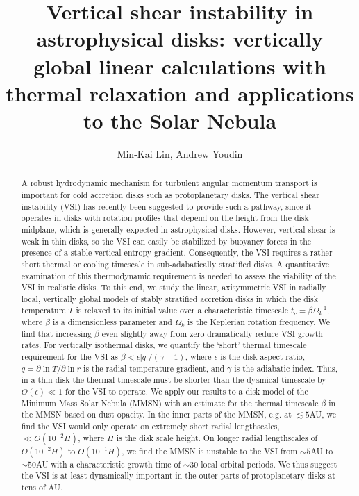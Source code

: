 \documentclass[iop]{emulateapj}
\newcommand{\p}{\partial}
\begin{document}
\title{Vertical shear instability in astrophysical disks: vertically global linear calculations with thermal relaxation and applications to the Solar Nebula} 
\author{Min-Kai Lin, Andrew Youdin}

\begin{abstract}
  A robust hydrodynamic mechanism for turbulent angular momentum
  transport is important for cold accretion disks such as 
  protoplanetary disks. The vertical shear instability (VSI) has 
  recently been suggested to provide such a pathway, since it operates in
  disks with rotation profiles that depend on the height from the 
  disk midplane, which is generally expected in  
  astrophysical disks. However, vertical shear is weak in thin disks, 
  so the VSI can easily be stabilized by buoyancy forces in the
  presence of a stable vertical entropy  gradient. %
  Consequently,  the VSI
  requires a rather short thermal or cooling timescale in
  sub-adabatically stratified disks.      
  A quantitative examination of this thermodynamic 
  requirement is needed to assess the viability of
  the VSI in realistic disks. To this end,  
  we study the linear, axisymmetric VSI in radially local, 
  vertically global models of stably stratified accretion disks in which the disk  
  temperature $T$ is relaxed to its initial value over a characteristic timescale 
  $t_c=\beta\Omega_k^{-1}$, where $\beta$ is a dimensionless parameter 
  and $\Omega_k$ is the Keplerian rotation frequency. %
  We find that 
  increasing $\beta$ even slightly away from    
  zero dramatically reduce VSI growth rates. 
  For vertically isothermal disks, we quantify the
  `short' thermal timescale requirement for the VSI as $\beta < \epsilon|q|/(\gamma-1)$, where
  $\epsilon$ is the disk aspect-ratio, $q = \p\ln T/\p\ln r$  is the radial temperature gradient, and 
  $\gamma$ is the adiabatic index. Thus, in a thin disk the thermal timescale must be shorter than 
  the dyamical timescale by $O(\epsilon)\ll 1$ for the VSI to operate.  
  We apply our results  
  to a disk model of the Minimum Mass Solar Nebula (MMSN) with an  
  estimate for the thermal timescale $\beta$ in the MMSN based on dust
  opacity. In the inner parts of the MMSN, e.g. at $\lesssim 5$AU, 
  we find the VSI would only operate on extremely short radial lengthscales, $\ll 
  O(10^{-2}H)$, where $H$ is the disk scale height. On longer radial 
  lengthscales of $O(10^{-2}H)$ to $O(10^{-1}H)$, we find the MMSN is
  unstable to the VSI from $\sim 5$AU to $\sim 50$AU with a
  characteristic growth time of $\sim 30$ local orbital periods.  
  We thus suggest the VSI is at least dynamically important in the 
  outer parts of protoplanetary disks at tens of AU. 
\end{abstract}
\end{document}
